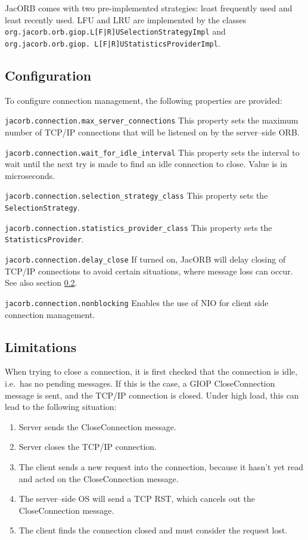 JacORB comes with two pre-implemented strategies: least frequently used and
least recently used. LFU and LRU are implemented by the classes {\tt
  org.jacorb.orb.giop.L[F|R]USelection\-StrategyImpl} and {\tt
  org.jacorb.orb.giop. L[F|R]U\-Statistics\-ProviderImpl}.

\subsection{Configuration}
\label{connection_management_config}
To configure connection management, the following properties are provided:
\begin{description}
\item {\tt jacorb.connection.max\_server\_connections} This property sets the
  maximum number of TCP/IP connections that will be listened on by the
  server--side ORB.
\item {\tt jacorb.connection.wait\_for\_idle\_interval} This property sets the
  interval to wait until the next try is made to find an idle connection to
  close. Value is in microseconds.
\item {\tt jacorb.connection.selection\_strategy\_class} This property sets
  the {\tt Selection\-Strategy}.
\item {\tt jacorb.connection.statistics\_provider\_class} This property sets
  the {\tt Statistics\-Provider}.
\item {\tt jacorb.connection.delay\_close} If turned on, JacORB will delay
  closing of TCP/IP connections to avoid certain situations, where message
  loss can occur. See also section \ref{connection_management_limitations}.
\item {\tt jacorb.connection.nonblocking} Enables the use of NIO for client
  side connection management.
\end{description}

\subsection{Limitations}
\label{connection_management_limitations}
When trying to close a connection, it is first checked that the connection is
idle, i.e.~has no pending messages.  If this is the case, a GIOP
CloseConnection message is sent, and the TCP/IP connection is closed. Under
high load, this can lead to the following situation:

\begin{enumerate}
\item Server sends the CloseConnection message.
\item Server closes the TCP/IP connection.
\item The client sends a new request into the connection, because it hasn't
  yet read and acted on the CloseConnection message.
\item The server--side OS will send a TCP RST, which cancels out the
  CloseConnection message.
\item The client finds the connection closed and must consider the request lost.
\end{enumerate}

